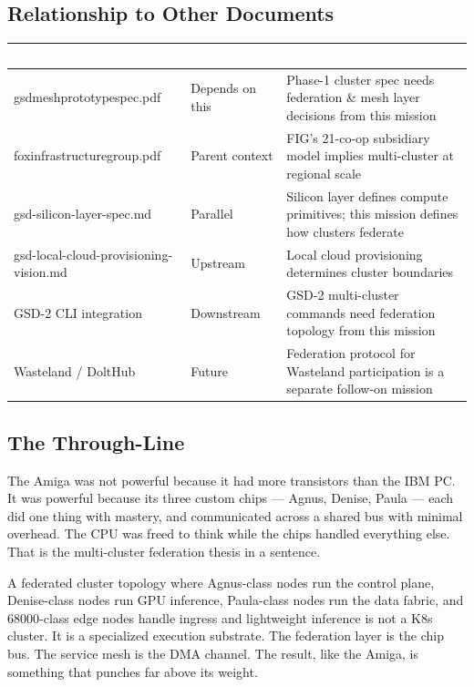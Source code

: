 \documentclass[11pt,letterpaper]{article}
\newcommand{\tableheader}[1]{\textbf{\sffamily\textcolor{white}{#1}}}
\begin{document}
\subsection{Relationship to Other Documents}

\begin{center}
\begin{tabularx}{\textwidth}{L{4.5cm}L{3cm}X}
\toprule
{}
\tableheader{Document} & \tableheader{Relationship} & \tableheader{Notes} \\
\midrule
gsdmeshprototypespec.pdf & Depends on this & Phase-1 cluster spec needs federation \& mesh layer decisions from this mission \\
foxinfrastructuregroup.pdf & Parent context & FIG's 21-co-op subsidiary model implies multi-cluster at regional scale \\
gsd-silicon-layer-spec.md & Parallel & Silicon layer defines compute primitives; this mission defines how clusters federate \\
gsd-local-cloud-provisioning-vision.md & Upstream & Local cloud provisioning determines cluster boundaries \\
GSD-2 CLI integration & Downstream & GSD-2 multi-cluster commands need federation topology from this mission \\
Wasteland / DoltHub & Future & Federation protocol for Wasteland participation is a separate follow-on mission \\
\bottomrule
\end{tabularx}
\end{center}

\subsection{The Through-Line}

The Amiga was not powerful because it had more transistors than the IBM PC. It was powerful because its three custom chips --- Agnus, Denise, Paula --- each did one thing with mastery, and communicated across a shared bus with minimal overhead. The CPU was freed to think while the chips handled everything else. That is the multi-cluster federation thesis in a sentence.

A federated cluster topology where Agnus-class nodes run the control plane, Denise-class nodes run GPU inference, Paula-class nodes run the data fabric, and 68000-class edge nodes handle ingress and lightweight inference is not a K8s cluster. It is a specialized execution substrate. The federation layer is the chip bus. The service mesh is the DMA channel. The result, like the Amiga, is something that punches far above its weight.
\end{document}
